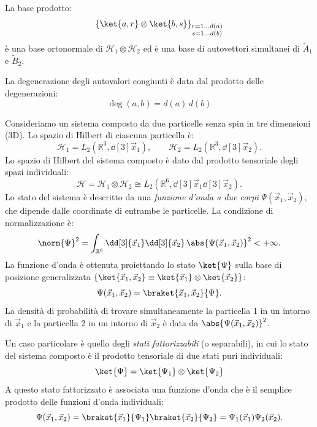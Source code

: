 La base prodotto:
\begin{equation}
    \left\{ \ket{a, r} \otimes \ket{b, s} \right\}_{\substack{r=1\dots d(a) \\ s=1\dots d(b)}}
\end{equation}
è una base ortonormale di \(\mathcal{H}_1 \otimes \mathcal{H}_2\) ed è una base di autovettori simultanei di \(\tilde{A}_1\) e \(\tilde{B}_2\).

La degenerazione degli autovalori congiunti è data dal prodotto delle degenerazioni:
\[
    \deg(a, b) = d(a)\,d(b)
\]

\begin{example}
    
Consideriamo un sistema composto da due particelle senza spin in tre dimensioni (3D).
Lo spazio di Hilbert di ciascuna particella è:
\[
    \mathcal{H}_1 = L_2(\mathbb{R}^3, \dd[3]{\vec{x}_1}), \qquad \mathcal{H}_2 = L_2(\mathbb{R}^3, \dd[3]{\vec{x}_2}).
\]
Lo spazio di Hilbert del sistema composto è dato dal prodotto tensoriale degli spazi individuali:
\[
    \mathcal{H} = \mathcal{H}_1 \otimes \mathcal{H}_2 \cong L_2(\mathbb{R}^6, \dd[3]{\vec{x}_1} \dd[3]{\vec{x}_2}).
\]
Lo stato del sistema è descritto da una \textit{funzione d'onda a due corpi} \(\Psi(\vec{x}_1, \vec{x}_2)\), che dipende dalle coordinate di entrambe le particelle.
La condizione di normalizzazione è:
\[
    \norm{\Psi}^2 = \int_{\mathbb{R}^6} \dd[3]{\vec{x}_1} \dd[3]{\vec{x}_2} \, \abs{\Psi(\vec{x}_1, \vec{x}_2)}^2 < +\infty.
\]
La funzione d'onda è ottenuta proiettando lo stato \(\ket{\Psi}\) sulla base di posizione generalizzata \(\left\{ \ket{\vec{x}_1, \vec{x}_2} \equiv \ket{\vec{x}_1} \otimes \ket{\vec{x}_2} \right\}\):
\[
    \Psi(\vec{x}_1, \vec{x}_2) = \braket{\vec{x}_1, \vec{x}_2}{\Psi}.
\]
La densità di probabilità di trovare simultaneamente la particella 1 in un intorno di \(\vec{x}_1\) e la particella 2 in un intorno di \(\vec{x}_2\) è data da \(\abs{\Psi(\vec{x}_1, \vec{x}_2)}^2\).

Un caso particolare è quello degli \textit{stati fattorizzabili} (o separabili), in cui lo stato del sistema composto è il prodotto tensoriale di due stati puri individuali:
\[
    \ket{\Psi} = \ket{\Psi_1} \otimes \ket{\Psi_2}
\]
A questo stato fattorizzato è associata una funzione d'onda che è il semplice prodotto delle funzioni d'onda individuali:
\[
    \Psi(\vec{x}_1, \vec{x}_2) = \braket{\vec{x}_1}{\Psi_1} \braket{\vec{x}_2}{\Psi_2} = \Psi_1(\vec{x}_1) \Psi_2(\vec{x}_2).
\]
\end{example}


